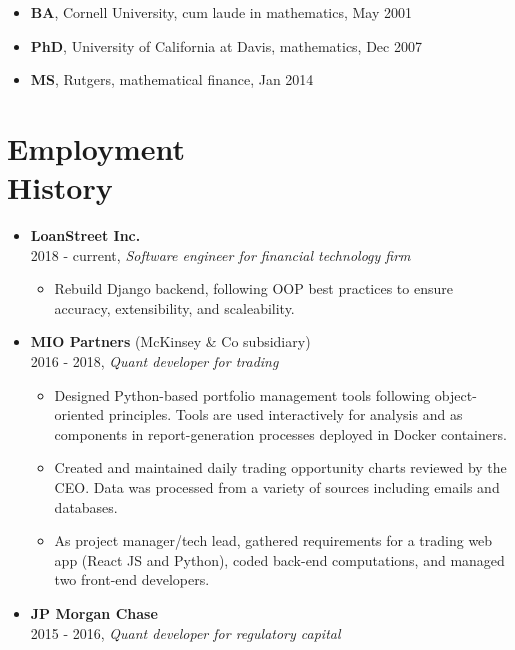 \documentclass[margin]{res}
\def\tightlist{}
\begin{document}
\begin{resume}
\begin{itemize}
\tightlist
\item
  \textbf{BA}, Cornell University, cum laude in mathematics, May 2001
\item
  \textbf{PhD}, University of California at Davis, mathematics, Dec 2007
\item
  \textbf{MS}, Rutgers, mathematical finance, Jan 2014
\end{itemize}

\section{\texorpdfstring{Employment\\
History}{Employment History}}\label{employment-history}

\begin{itemize}
\item
  \textbf{LoanStreet Inc.}\\
  2018 - current, \emph{Software engineer for financial technology firm}

  \begin{itemize}
  \tightlist
  \item
    Rebuild Django backend, following OOP best practices to ensure
    accuracy, extensibility, and scaleability.
  \end{itemize}
\item
  \textbf{MIO Partners} (McKinsey \& Co subsidiary)\\
  2016 - 2018, \emph{Quant developer for trading}

  \begin{itemize}
  \tightlist
  \item
    Designed Python-based portfolio management tools following
    object-oriented principles. Tools are used interactively for
    analysis and as components in report-generation processes deployed
    in Docker containers.
  \item
    Created and maintained daily trading opportunity charts reviewed by
    the CEO. Data was processed from a variety of sources including
    emails and databases.
  \item
    As project manager/tech lead, gathered requirements for a trading
    web app (React JS and Python), coded back-end computations, and
    managed two front-end developers.
  \end{itemize}
\item
  \textbf{JP Morgan Chase}\\
  2015 - 2016, \emph{Quant developer for regulatory capital}


\end{itemize}
\end{resume}
\end{document}
